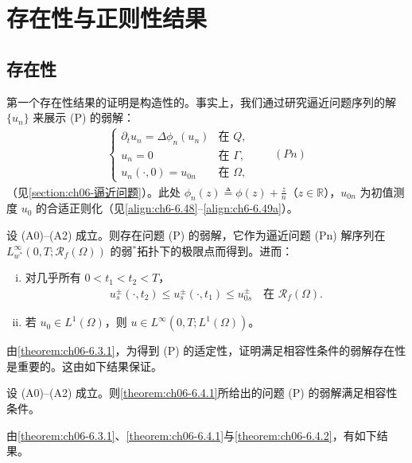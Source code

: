 \documentclass[../../main.tex]{subfiles}%
\begin{document}
\section{存在性与正则性结果}\label{section:ch06-存在正则}

\subsection{存在性}\label{subsection:ch06-存在性}

第一个存在性结果的证明是构造性的。事实上，我们通过研究逼近问题序列的解 $\{u_n\}$ 来展示 (P) 的弱解：
\begin{align*}
\begin{cases}
\partial_t u_n=\Delta\phi_n(u_n) & \text{在 }Q,\\
u_n=0 & \text{在 }\Gamma,\\
u_n(\cdot,0)=u_{0n} & \text{在 }\Omega,
\end{cases}
\qquad(Pn)
\end{align*}
（见\cref{section:ch06-逼近问题}）。此处 $\phi_n(z)\triangleq \phi(z)+\frac{z}{n}$（$z\in\mathbb{R}$），$u_{0n}$ 为初值测度 $u_0$ 的合适正则化（见\eqref{align:ch6-6.48}--\eqref{align:ch6-6.49a}）。

\begin{theorem}\label{theorem:ch06-6.4.1}
设 (A0)--(A2) 成立。则存在问题 (P) 的弱解，它作为逼近问题 (Pn) 解序列在 $L^\infty_{w^*}(0,T;\mathscr{R}_f(\Omega))$ 的弱$^*$拓扑下的极限点而得到。进而：
\begin{enumerate}[(i)]
\item 对几乎所有 $0<t_1<t_2<T$，
\begin{align}
u^\pm_s(\cdot,t_2)\leqslant u^\pm_s(\cdot,t_1)\leqslant u^\pm_{0s} \quad\text{在 }\mathscr{R}_f(\Omega). \label{align:ch6-6.33}
\end{align}
\item 若 $u_0\in L^1(\Omega)$，则 $u\in L^\infty(0,T;L^1(\Omega))$。
\end{enumerate}
\end{theorem}

由\cref{theorem:ch06-6.3.1}，为得到 (P) 的适定性，证明满足相容性条件的弱解存在性是重要的。这由如下结果保证。

\begin{theorem}\label{theorem:ch06-6.4.2}\label{proposition:ch06-6.4.2}
设 (A0)--(A2) 成立。则\cref{theorem:ch06-6.4.1}所给出的问题 (P) 的弱解满足相容性条件。
\end{theorem}

由\cref{theorem:ch06-6.3.1}、\cref{theorem:ch06-6.4.1}与\cref{theorem:ch06-6.4.2}，有如下结果。
\end{document}
